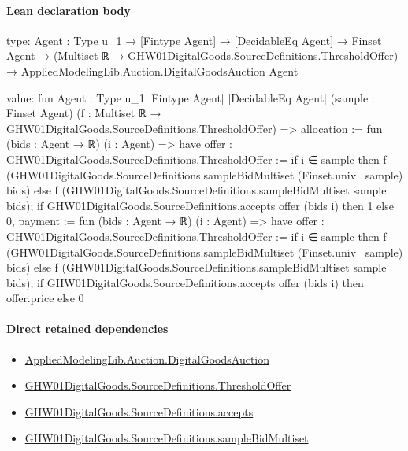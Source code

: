\documentclass[10pt]{article}
\begin{document}
\paragraph{Lean declaration body}
\begin{ReviewVerbatim}
type:
{Agent : Type u_1} →
  [Fintype Agent] →
    [DecidableEq Agent] →
      Finset Agent →
        (Multiset ℝ → GHW01DigitalGoods.SourceDefinitions.ThresholdOffer) →
          AppliedModelingLib.Auction.DigitalGoodsAuction Agent

value:
fun {Agent : Type u_1} [Fintype Agent] [DecidableEq Agent] (sample : Finset Agent)
    (f : Multiset ℝ → GHW01DigitalGoods.SourceDefinitions.ThresholdOffer) =>
  {
    allocation := fun (bids : Agent → ℝ) (i : Agent) =>
      have offer : GHW01DigitalGoods.SourceDefinitions.ThresholdOffer :=
        if i ∈ sample then f (GHW01DigitalGoods.SourceDefinitions.sampleBidMultiset (Finset.univ \ sample) bids)
        else f (GHW01DigitalGoods.SourceDefinitions.sampleBidMultiset sample bids);
      if GHW01DigitalGoods.SourceDefinitions.accepts offer (bids i) then 1 else 0,
    payment := fun (bids : Agent → ℝ) (i : Agent) =>
      have offer : GHW01DigitalGoods.SourceDefinitions.ThresholdOffer :=
        if i ∈ sample then f (GHW01DigitalGoods.SourceDefinitions.sampleBidMultiset (Finset.univ \ sample) bids)
        else f (GHW01DigitalGoods.SourceDefinitions.sampleBidMultiset sample bids);
      if GHW01DigitalGoods.SourceDefinitions.accepts offer (bids i) then offer.price else 0 }
\end{ReviewVerbatim}

\paragraph{Direct retained dependencies}
\begin{itemize}\raggedright
\item \hyperlink{governing-declaration-7d5372964da104c4}{Applied\allowbreak{}Modeling\allowbreak{}Lib.\allowbreak{}Auction.\allowbreak{}Digital\allowbreak{}Goods\allowbreak{}Auction}
\item \hyperlink{governing-declaration-5888f23d4aefdde3}{GHW01\allowbreak{}Digital\allowbreak{}Goods.\allowbreak{}Source\allowbreak{}Definitions.\allowbreak{}Threshold\allowbreak{}Offer}
\item \hyperlink{paper-prerequisite-416a6a5daee58bf1}{GHW01\allowbreak{}Digital\allowbreak{}Goods.\allowbreak{}Source\allowbreak{}Definitions.\allowbreak{}accepts}
\item \hyperlink{governing-declaration-b26c3ea1f1b28e35}{GHW01\allowbreak{}Digital\allowbreak{}Goods.\allowbreak{}Source\allowbreak{}Definitions.\allowbreak{}sample\allowbreak{}Bid\allowbreak{}Multiset}
\end{itemize}
\hypertarget{governing-declaration-b3f0d127dab9fff7}{}
\end{document}
